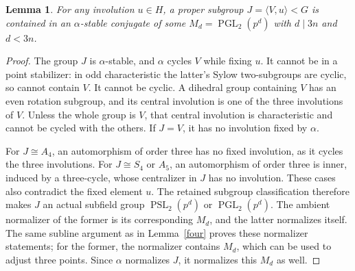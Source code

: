 \documentclass[11pt,a4paper]{article}
\newtheorem{lemma}{Lemma}
\newcommand{\PSL}{\operatorname{PSL}}
\newcommand{\PGL}{\operatorname{PGL}}
\newcommand{\gen}[1]{\langle#1\rangle}
\begin{document}
\begin{lemma}\label{bad}
For any involution $u\in H$, a proper subgroup
$J=\gen{V,u}<G$ is contained in an $\alpha$-stable conjugate
of some $M_d=\PGL_2(p^d)$ with $d\mid3n$ and $d<3n$.
\end{lemma}
\begin{proof}
The group $J$ is $\alpha$-stable, and $\alpha$ cycles $V$ while
fixing $u$. It cannot be in a point stabilizer: in odd characteristic
the latter's Sylow two-subgroups are cyclic, so cannot contain $V$.
It cannot be cyclic. A dihedral group containing $V$ has an even
rotation subgroup, and its central involution is one of the three
involutions of $V$. Unless the whole group is $V$, that central
involution is characteristic and cannot be cycled with the others.
If $J=V$, it has no involution fixed by $\alpha$.

For $J\cong A_4$, an automorphism of order three has no fixed
involution, as it cycles the three involutions. For $J\cong S_4$
or $A_5$, an automorphism of order three is inner, induced by a
three-cycle, whose centralizer in $J$ has no involution. These
cases also contradict the fixed element $u$.
The retained subgroup classification therefore makes $J$ an actual
subfield group $\PSL_2(p^d)$ or $\PGL_2(p^d)$.
The ambient normalizer of the former is its corresponding $M_d$,
and the latter normalizes itself. The same subline argument as in
Lemma~\ref{four} proves these normalizer statements; for the former,
the normalizer contains $M_d$, which can be used to adjust three points.
Since $\alpha$ normalizes $J$, it normalizes this $M_d$ as well.
\end{proof}
\end{document}

